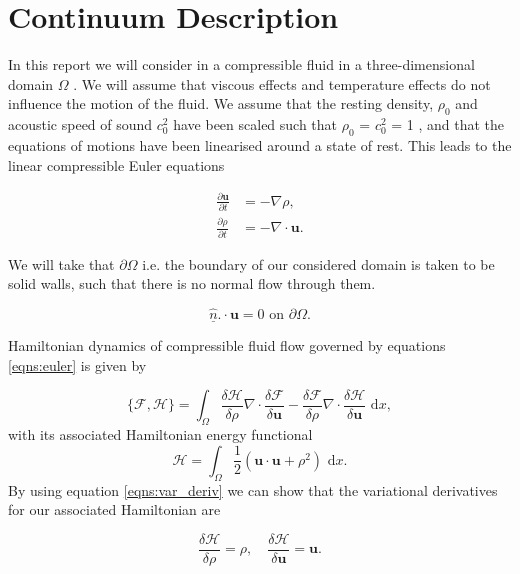 \documentclass[a4paper,11pt]{article}
\begin{document}
\section{Continuum Description}

In this report we will consider in a compressible fluid in a three-dimensional domain $\Omega$ . We will assume that viscous effects and temperature effects do not influence the motion of the fluid. We assume that the resting density, $\rho_0$ and acoustic speed of sound $c^2_0$ have been scaled such that $\rho_0$ =  $c^2_0$ = 1  , and that the  equations of motions  have been linearised around a state of rest. This leads to the linear compressible Euler equations

\begin{equation}\label{eqns:euler}
\begin{aligned}
\frac{\partial \mathbf{u}  }{\partial t} &= -\nabla \rho ,\\
\frac{\partial \rho }{\partial t} &= - \nabla \cdot \mathbf{u} .
\end{aligned}
\end{equation}

We will take that $\partial \Omega$ i.e. the boundary of our considered domain is  taken to be solid walls, such that there is no normal flow through them. 

\[ \hat{\underline{n}}.\cdot \mathbf{u}= 0 \text{ on } \partial \Omega .\]




Hamiltonian dynamics of compressible fluid flow governed by equations \eqref{eqns:euler} is given by

\begin{equation}\label{eqns:pb} \{ \mathcal{F},  \mathcal{H}\} = \int_\Omega \frac{\delta  \mathcal{H}}{\delta \rho} \nabla \cdot \frac{\delta  \mathcal{F}}{\delta \mathbf{u}} - \frac{\delta  \mathcal{F}}{\delta \rho} \nabla \cdot \frac{\delta  \mathcal{H}}{\delta \mathbf{u}} \text{ d}x,\end{equation}
with its associated Hamiltonian energy functional
\[  \mathcal{H} = \int_\Omega \frac{1}{2} ( \mathbf{u}\cdot \mathbf{u} + \rho^2) \text{ d}x.\]
By using equation \eqref{eqns:var_deriv} we can show  that the variational derivatives for our associated Hamiltonian are

\begin{equation}
\frac{\delta \mathcal{H}}{\delta \rho} =\rho, \quad
\frac{\delta \mathcal{H}}{\delta \mathbf{u}}= \mathbf{u}.
\end{equation}
\end{document}
